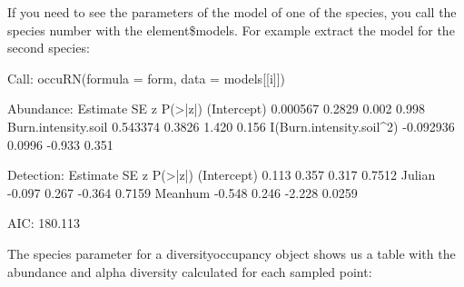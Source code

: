 \documentclass[article]{jss}
\begin{document}
If you need to see the parameters of the model of one of the species,
you call the species number with the element\$models. For example
extract the model for the second species:

\begin{CodeChunk}
\begin{CodeOutput}

Call:
occuRN(formula = form, data = models[[i]])

Abundance:
                          Estimate     SE      z P(>|z|)
(Intercept)               0.000567 0.2829  0.002   0.998
Burn.intensity.soil       0.543374 0.3826  1.420   0.156
I(Burn.intensity.soil^2) -0.092936 0.0996 -0.933   0.351

Detection:
            Estimate    SE      z P(>|z|)
(Intercept)    0.113 0.357  0.317  0.7512
Julian        -0.097 0.267 -0.364  0.7159
Meanhum       -0.548 0.246 -2.228  0.0259

AIC: 180.113 
\end{CodeOutput}
\end{CodeChunk}

The species parameter for a diversityoccupancy object shows us a table with the abundance and alpha diversity calculated for each sampled point:
\end{document}
